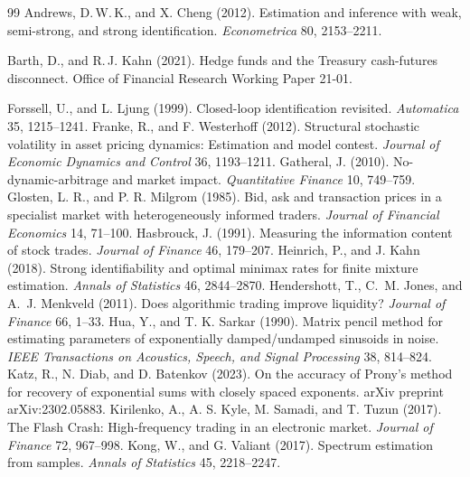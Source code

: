 \documentclass[12pt]{article}
\theoremstyle{definition}
\theoremstyle{remark}
\begin{document}
\begin{thebibliography}{99}
 Andrews, D.\,W.\,K., and X. Cheng (2012). Estimation and inference with weak, semi-strong, and strong identification. \emph{Econometrica} 80, 2153--2211.

 Barth, D., and R.\,J. Kahn (2021). Hedge funds and the Treasury cash-futures disconnect. Office of Financial Research Working Paper 21-01.

 Forssell, U., and L. Ljung (1999). Closed-loop identification revisited. \emph{Automatica} 35, 1215--1241.
 Franke, R., and F. Westerhoff (2012). Structural stochastic volatility in asset pricing dynamics: Estimation and model contest. \emph{Journal of Economic Dynamics and Control} 36, 1193--1211.
 Gatheral, J. (2010). No-dynamic-arbitrage and market impact. \emph{Quantitative Finance} 10, 749--759.
 Glosten, L. R., and P. R. Milgrom (1985). Bid, ask and transaction prices in a specialist market with heterogeneously informed traders. \emph{Journal of Financial Economics} 14, 71--100.
 Hasbrouck, J. (1991). Measuring the information content of stock trades. \emph{Journal of Finance} 46, 179--207.
 Heinrich, P., and J. Kahn (2018). Strong identifiability and optimal minimax rates for finite mixture estimation. \emph{Annals of Statistics} 46, 2844--2870.
 Hendershott, T., C.~M. Jones, and A.~J. Menkveld (2011). Does algorithmic trading improve liquidity? \emph{Journal of Finance} 66, 1--33.
 Hua, Y., and T. K. Sarkar (1990). Matrix pencil method for estimating parameters of exponentially damped/undamped sinusoids in noise. \emph{IEEE Transactions on Acoustics, Speech, and Signal Processing} 38, 814--824.
 Katz, R., N. Diab, and D. Batenkov (2023). On the accuracy of Prony's method for recovery of exponential sums with closely spaced exponents. arXiv preprint arXiv:2302.05883.
 Kirilenko, A., A. S. Kyle, M. Samadi, and T. Tuzun (2017). The Flash Crash: High-frequency trading in an electronic market. \emph{Journal of Finance} 72, 967--998.
 Kong, W., and G. Valiant (2017). Spectrum estimation from samples. \emph{Annals of Statistics} 45, 2218--2247.

\end{thebibliography}
\end{document}
